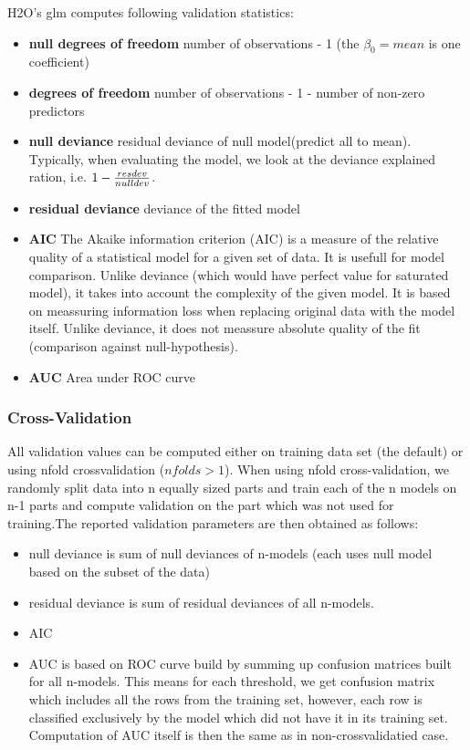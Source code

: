 \documentclass[11pt]{article}
\begin{document}
H2O's glm computes following validation statistics:
\begin{itemize} 
\item \textbf{null degrees of freedom} number of observations - 1 (the $\beta_0=mean$ is one coefficient)
\item \textbf{degrees of freedom} number of observations - 1 - number of non-zero predictors

\item \textbf{null deviance} residual deviance of null model(predict all to mean). Typically, when evaluating the model, we look at the deviance explained ration, i.e. $ 1 -{ resdev \over nulldev}$.
\item \textbf{residual deviance} deviance of the fitted model
\item \textbf{AIC} The Akaike information criterion (AIC) is a measure of the relative quality of a statistical model for a given set of data. It is usefull for model comparison. Unlike deviance (which would have perfect value for saturated model), it takes into account the complexity of the given model. It is based on meassuring information loss when replacing original data with the model itself. Unlike deviance, it does not meassure absolute quality of the fit (comparison against null-hypothesis).

\item \textbf{AUC} Area under ROC curve
\end{itemize}

\subsubsection{Cross-Validation}
All validation values can be computed either on training data set (the default) or using nfold crossvalidation ($nfolds > 1$). When using nfold cross-validation, we randomly split data into n equally sized parts and train each of the n models on n-1 parts and compute validation on the part which was not used for training.The reported validation parameters are then obtained as follows:
\begin{itemize} 
\item null deviance is sum of null deviances of n-models (each uses null model based on the subset of the data)
\item residual deviance is sum of residual deviances of all n-models.
\item AIC
\item AUC is based on ROC curve build  by summing up confusion matrices built for all n-models.
This means for each threshold, we get confusion matrix which includes all the rows from
the training set, however, each row is classified exclusively by the model
which did not have it in its training set. Computation of AUC itself is then the same as in non-crossvalidatied case. 
\end{itemize}
\end{document}

